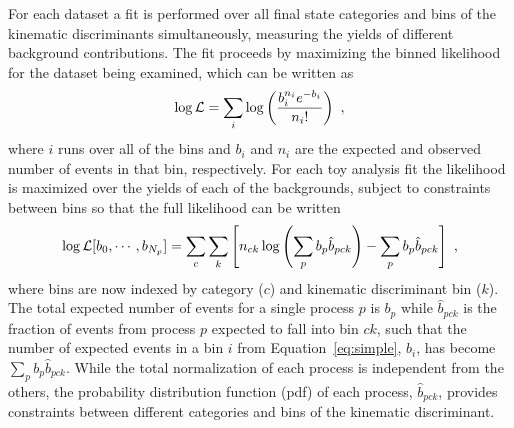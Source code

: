 For each dataset a fit is performed over all final state categories and bins of the kinematic discriminants simultaneously, measuring the yields of different background contributions. The fit proceeds by maximizing the binned likelihood for the dataset being examined, which can be written as
\begin{equation}
\log {\cal L} = \sum_{i} \log \left( \frac{ b_{i}^{n_{i}}e^{-b_{i}} }{n_{i}!} \right) ~,
\label{eq:simple}
\end{equation}
where $i$ runs over all of the bins and $b_{i}$ and $n_{i}$ are the expected and observed number of events in that bin, respectively. For each toy analysis fit the likelihood is maximized over the yields of each of the backgrounds, subject to constraints between bins so that the full likelihood can be written
\begin{equation}
\log {\cal L}[b_{0},\cdots,b_{N_{p}}] = \sum_{c}\sum_{k} \left[ n_{ck} \log \left(\sum_p b_{p} \hat{b}_{pck}\right) - \sum_p b_{p} \hat{b}_{pck}\right] ~,
\label{eq:full}
\end{equation}
where bins are now indexed by category ($c$) and kinematic discriminant bin ($k$). The total expected number of events for a single process $p$ is $b_{p}$ while $\hat{b}_{pck}$ is the fraction of events from process $p$ expected to fall into bin $ck$, such that the number of expected events in a bin $i$ from Equation~\eqref{eq:simple}, $b_{i}$, has become $\sum_p b_{p} \hat{b}_{pck}$. While the total normalization of each process is independent from the others, the probability distribution function (pdf) of each process, $\hat{b}_{pck}$, provides constraints between different categories and bins of the kinematic discriminant.

